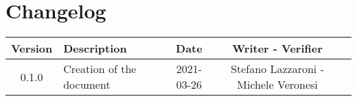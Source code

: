 \section*{Changelog}

\begin{center}
	\begin{longtable}{|c|p{5cm}|c|c|c|}
	\hline
	\rowcolor{lighter-grayer}
	\textbf{Version} & \textbf{Description} & \textbf{Date} & \textbf{Writer - Verifier} \\
	\hline
	\endfirsthead


	\hline
	0.1.0 & Creation of the document & 2021-03-26 & Stefano Lazzaroni - Michele Veronesi \\
	\hline

	\end{longtable}
\end{center}